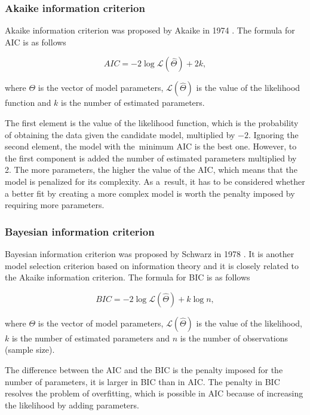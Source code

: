 \documentclass[english]{pwr_wmat_praca_dyplomowa}
\theoremstyle{plain}
\numberwithin{theorem}{chapter}
\theoremstyle{definition}
\numberwithin{theorem}{chapter}
\begin{document}
	\subsubsection{Akaike information criterion}
	
	Akaike information criterion was proposed by Akaike in 1974 \cite{aic}. The formula for AIC is as follows
	
	\begin{equation}
	AIC = -2 \log{\mathcal{L}(\hat{\Theta})} + 2k,
	\end{equation}
	
	\noindent where $\Theta$ is the vector of model parameters, $\mathcal{L}(\hat{\Theta})$ is the value of the likelihood function and $k$ is the number of estimated parameters. 
	
	The first element is the value of the likelihood function, which is the probability of obtaining the data given the candidate model, multiplied by $-2$. Ignoring the second element, the model with the~minimum AIC is the best one. However, to the first component is added the number of estimated parameters multiplied by 2. The more parameters, the higher the value of the AIC, which means that the model is penalized for its complexity. As a~result, it has to be considered whether a better fit by creating a more complex model is worth the penalty imposed by requiring more parameters.
	
	\subsubsection{Bayesian information criterion}
	
	Bayesian information criterion was proposed by Schwarz in 1978 \cite{bic}. It is another model selection criterion based on information theory and it is closely related to the Akaike information criterion. The formula for BIC is as follows
	
	\begin{equation}
	BIC = -2 \log{\mathcal{L}(\hat{\Theta})} + k\log{n},
	\end{equation}
	
	\noindent where $\Theta$ is the vector of model parameters, $\mathcal{L}(\hat{\Theta})$ is the value of the likelihood, $k$ is the number of estimated parameters and $n$ is the number of observations (sample size). 
	
	The difference between the AIC and the BIC is the penalty imposed for the number of parameters, it is larger in BIC than in AIC. The penalty in BIC resolves the problem of overfitting, which is possible in AIC because of increasing the likelihood by adding parameters.
	
\end{document}

